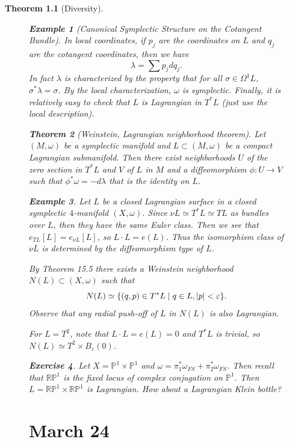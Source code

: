 \documentclass[leqno, openany]{memoir}
\newtheorem{thm}{Theorem}[chapter]
\theoremstyle{definition}
\newtheorem{exm}[thm]{Example}
\newtheorem{exer}[thm]{Exercise}
\theoremstyle{remark}
\theoremstyle{plain}
\theoremstyle{definition}
\theoremstyle{remark}
\newcommand{\R}{\mathbb{R}}
\renewcommand{\P}{\mathbb{P}}
\newcommand{\ep}{\varepsilon}
\begin{document}
\begin{thm}[Diversity]
\begin{figure}[H]
\begin{exm}[Canonical Symplectic Structure on the Cotangent Bundle]
        In local coordinates, if $p_j$ are the coordinates on $L$ and $q_j$ are
        the cotangent coordinates, then we have \[ \lambda = \sum p_j d q_j. \]
        In fact $\lambda$ is characterized by the property that for all $\sigma
        \in \Omega^1 L$, $\sigma^* \lambda = \sigma$. By the local
        characterization, $\omega$ is symplectic. Finally, it is relatively
        easy to check that $L$ is Lagrangian in $T^*L$ (just use the local
        description).  \end{exm}

    \begin{thm}[Weinstein, Lagrangian neighborhood theorem] Let $(M, \omega)$
        be a symplectic manifold and $L \subset (M, \omega)$ be a compact
        Lagrangian submanifold. Then there exist neighborhoods $U$ of the zero
        section in $T^*L$ and $V$ of $L$ in $M$ and a diffeomorphism $\phi: U
        \to V$ such that $\phi^* \omega = - d \lambda$ that is the identity on
        $L$.  \end{thm}

    \begin{exm} Let $L$ be a closed Lagrangian surface in a closed symplectic
        $4$-manifold $(X, \omega)$. Since $\nu L \simeq T^*L \simeq TL$ as
        bundles over $L$, then they have the same Euler class. Then we see that
        $e_{TL}[L] = e_{\nu L}[L]$, so $L \cdot L = e(L)$. Thus the isomorphism
        class of $\nu L$ is determined by the diffeomorphism type of $L$.

    By Theorem 15.5 there exists a Weinstein neighborhood $N(L) \subset (X,
    \omega)$ such that \[N(L) \simeq \{ (q,p) \in T^* L \mid q \in L, \abs{p} <
    \ep \}. \] Observe that any radial push-off of $L$ in $N(L)$ is also
    Lagrangian.

    For $L = T^2$, note that $L \cdot L = e(L) = 0$ and $T^*L$ is trivial, so
$N(L) \simeq T^2 \times B_{\ep}(0)$.  \end{exm}

    \begin{exer} Let $X = \P^1 \times \P^1$ and $\omega = \pi_1^* \omega_{FS} +
        \pi_2^* \omega_{FS}$. Then recall that $\R\P^1$ is the fixed locus of
        complex conjugation on $\P^1$. Then $L = \R\P^1 \times \R\P^1$ is
        Lagrangian. How about a Lagrangian Klein bottle?  \end{exer}

    \chapter{March 24}%
    

\end{figure}
\end{thm}
\end{document}
